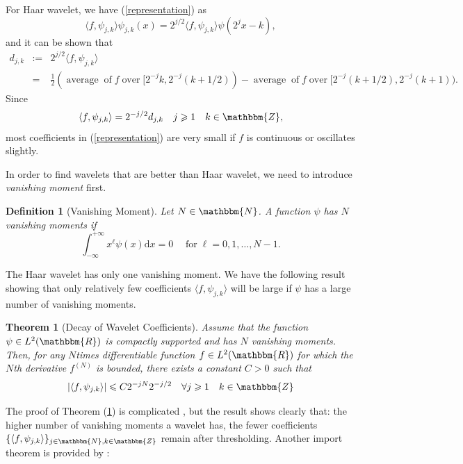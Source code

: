 \documentclass{book}
\newcommand{\assign}{:=}
\newcommand{\mathd}{\mathrm{d}}
\newcommand{\nobracket}{}
\newcommand{\tmop}[1]{\ensuremath{\operatorname{#1}}}
\newcommand{\tmtextit}[1]{{\itshape{#1}}}
\newtheorem{definition}{Definition}
{\theorembodyfont{\rmfamily}\newtheorem{example}{Example}}
\newtheorem{theorem}{Theorem}
\begin{document}
\begin{example}
  For Haar wavelet, we have (\ref{representation}) as
  \[ \langle f, \psi_{j, k} \rangle \psi_{j, k} (x) = 2^{j / 2} \langle f,
     \psi_{j, k} \rangle \psi (2^j x - k), \]
  and it can be shown that
  \begin{eqnarray*}
    d_{j, k} & \assign & 2^{j / 2} \langle f, \psi_{j, k} \rangle\\
    & = & \frac{1}{2} (\tmop{average} \tmop{of} f \tmop{over} [2^{- j} k,
    2^{- j} (k + 1 / 2)) - \tmop{average} \tmop{of} f \tmop{over} [2^{- j} (k
    + 1 / 2), 2^{- j} (\nobracket k + 1)) .
  \end{eqnarray*}
  Since
  \[ \langle f, \psi_{j, k} \rangle = 2^{- j / 2} d_{j, k} \quad j \geqslant 1
     \quad k \in \mathbbm{Z}, \]
  most coefficients in (\ref{representation}) are very small if $f$ is
  continuous or oscillates slightly.
\end{example}

In order to find wavelets that are better than Haar wavelet, we need to
introduce \tmtextit{vanishing moment} first.

\begin{definition}[Vanishing Moment]
  Let $N \in \mathbbm{N}$. A function $\psi$ has $N$ vanishing moments if
  \[ \int_{- \infty}^{+ \infty} x^{\ell} \psi (x) \mathd x = 0 \quad
     \tmop{for} \ell = 0, 1, \ldots, N - 1. \]
\end{definition}

The Haar wavelet has only one vanishing moment. We have the following result
showing that only relatively few coefficients $\langle f, \psi_{j, k} \rangle$
will be large if $\psi$ has a large number of vanishing moments.

\begin{theorem}[Decay of Wavelet Coefficients]
  \label{thm:decay}Assume that the function $\psi \in L^2 (\mathbbm{R}) $ is
  compactly supported and has $N$ vanishing moments. Then, for any $N$times
  differentiable function $f \in L^2 (\mathbbm{R})$ for which the $N$th
  derivative $f^{(N)}$ is bounded, there exists a constant $C > 0$ such that
  \begin{equation}
    | \langle f, \psi_{j, k} \rangle | \leqslant C 2^{- j N} 2^{- j / 2} \quad
    \forall j \geqslant 1 \quad k \in \mathbbm{Z} \label{basicEstimate}
  \end{equation}
\end{theorem}

The proof of Theorem (\ref{thm:decay}) is complicated
{\cite{walnut2013introduction}}, but the result shows clearly that: the higher
number of vanishing moments a wavelet has, the fewer coefficients $\{ \langle
f, \psi_{j, k} \rangle \}_{j \in \mathbbm{N}, k \in \mathbbm{Z}}$ remain after
thresholding. Another import theorem is provided by
{\cite{walnut2013introduction}}:
\end{document}
